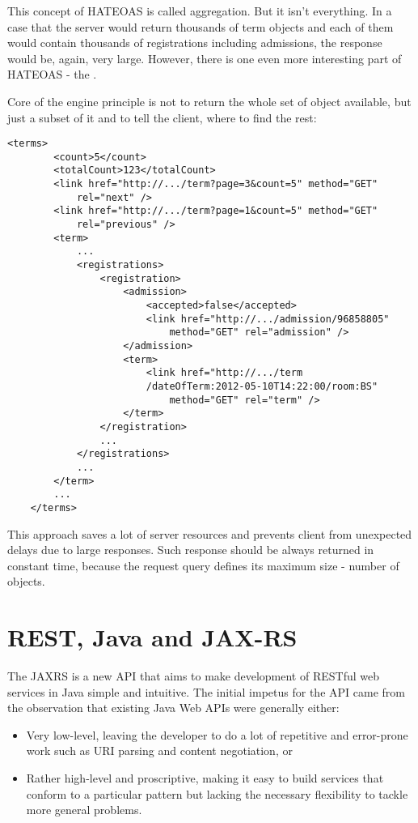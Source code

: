 	This concept of HATEOAS is called aggregation. But it isn't everything. In a case that the server would return
	thousands of term objects and each of them would contain thousands of registrations including admissions, the response
	would be, again, very large. However, there is one even more interesting part of HATEOAS - the .
	
	Core of the engine principle is not to return the whole set of object available, but just a subset of it and to
	tell the client, where to find the rest:
	
	\begin{lstlisting}[tabsize=2]
	<terms>
		<count>5</count>
		<totalCount>123</totalCount>
		<link href="http://.../term?page=3&count=5" method="GET" 
			rel="next" />
		<link href="http://.../term?page=1&count=5" method="GET" 
			rel="previous" />
		<term>
			...
			<registrations>
				<registration>
					<admission>
						<accepted>false</accepted>
						<link href="http://.../admission/96858805" 
							method="GET" rel="admission" />
					</admission>
					<term>
						<link href="http://.../term
						/dateOfTerm:2012-05-10T14:22:00/room:BS"
							method="GET" rel="term" />
					</term>
				</registration>
				...
			</registrations>
			...
		</term>
		...
	</terms>
	\end{lstlisting}
	
	This approach saves a lot of server resources and prevents client from unexpected delays due to large responses. Such
	response should be always returned in constant time, because the request query defines its maximum size - number of
	objects.
	
	\section{REST, Java and JAX-RS}\label{sec:jaxrs}
	
	\cite[p.~xiii]{restful} The \gls{JAXRS} is a new API that aims to make development of RESTful web services in Java
	simple and intuitive. The initial impetus for the API came from the observation that existing Java Web APIs were
	generally either:
	\begin{itemize}
	  \item Very low-level, leaving the developer to do a lot of repetitive and error-prone work such as URI parsing and
	  content negotiation, or
	  \item Rather high-level and proscriptive, making it easy to build services that conform to a particular pattern but
	  lacking the necessary flexibility to tackle more general problems. 
	\end{itemize}


